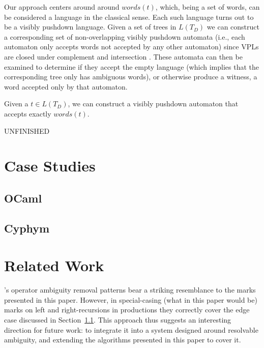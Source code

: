 \documentclass[acmsmall,review,anonymous]{acmart}\settopmatter{printfolios=true,printccs=false,printacmref=false}
\newcommand{\words}{\mathit{words}} %
\begin{document}
Our approach centers around around $\words(t)$, which, being a set of words, can be considered a language in the classical sense. Each such language turns out to be a visibly pushdown language. Given a set of trees in $L(T_D)$ we can construct a corresponding set of non-overlapping visibly pushdown automata (i.e., each automaton only accepts words not accepted by any other automaton) since VPLs are closed under complement and intersection \cite{alurVisiblyPushdownLanguages2004}. These automata can then be examined to determine if they accept the empty language (which implies that the corresponding tree only has ambiguous words), or otherwise produce a witness, a word accepted only by that automaton.

\begin{theorem}
  Given a $t \in L(T_D)$, we can construct a visibly pushdown automaton that accepts exactly $\words(t)$.
\end{theorem}

UNFINISHED

\section{Case Studies} \label{sec:evaluation}

\subsection{OCaml} \label{sec:evaluation-ocaml}


\subsection{Cyphym} \label{sec:evaluation-cyphym}

\section{Related Work}

\citet{afroozehSafeSpecificationOperator2013}'s operator ambiguity removal patterns bear a striking resemblance to the marks presented in this paper. However, in special-casing (what in this paper would be) marks on left and right-recursions in productions they correctly cover the edge case discussed in Section~\ref{sec:evaluation-ocaml}. This approach thus suggests an interesting direction for future work: to integrate it into a system designed around resolvable ambiguity, and extending the algorithms presented in this paper to cover it.
\end{document}
